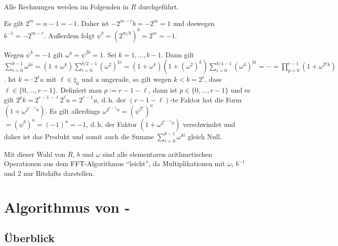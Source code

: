 \begin{Beweis}
    Alle Rechnungen werden im Folgenden in $R$ durchgeführt.

    Es gilt $2^m = n - 1 = -1$.
    Daher ist $-2^{m-r} b = -2^m = 1$ und deswegen $b^{-1} = -2^{m-r}$.
    Außerdem folgt $\psi^b = (2^{m/b})^b = 2^m = -1$.

    Wegen $\psi^b = -1$ gilt $\omega^b = \psi^{2b} = 1$.
    Sei $k = 1, \dotsc, b - 1$.
    Dann gilt\\
    $\sum_{i=0}^{b-1} \omega^{ki} = (1 + \omega^k) \sum_{i=0}^{b/2-1} (\omega^2)^{ki}
    = (1 + \omega^k) (1 + (\omega^2)^k) \sum_{i=0}^{b/4-1} (\omega^4)^{ki}
    = \dotsb
    = \prod_{p=0}^{r-1} (1 + \omega^{2^p k})$.
    Ist $k =: 2^\ell u$ mit $\ell \in \natural_0$ und $u$ ungerade,
    so gilt wegen $k < b = 2^r$, dass $\ell \in \{0, \dotsc, r - 1\}$.
    Definiert man $p := r - 1 - \ell$, dann ist $p \in \{0, \dotsc, r - 1\}$ und
    es gilt $2^p k = 2^{r-1-\ell} 2^\ell u = 2^{r-1} u$,
    d.\,h. der $(r-1-\ell)$-te Faktor hat die Form $(1 + \omega^{2^{r-1} u})$.
    Es gilt allerdings $\omega^{2^{r-1} u} = (\psi^{2^r})^u$\\
    $= (\psi^b)^u = (-1)^u = -1$,
    d.\,h. der Faktor $(1 + \omega^{2^{r-1} u})$ verschwindet und
    daher ist das Produkt und somit auch die Summe
    $\sum_{i=0}^{b-1} \omega^{ki}$ gleich Null.
\end{Beweis}

Mit dieser Wahl von $R$, $b$ und $\omega$ sind alle elementaren arithmetischen Operationen
aus dem FFT-Algorithmus "`leicht"', da Multiplikationen mit $\omega$, $b^{-1}$ und $2$ nur
Bitshifts darstellen.

\pagebreak

\section{%
    Algorithmus von -%
}

\subsection{%
    Überblick%
}

